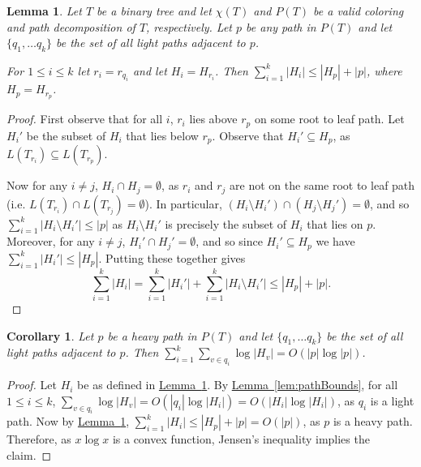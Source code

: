 \documentclass[11pt]{article}
\newtheorem{lemma}[theorem]{Lemma}
\newtheorem{corollary}[theorem]{Corollary}
\theoremstyle{definition}
\newcommand{\Lem}[1]{\hyperref[lem:#1]{Lemma~\ref*{lem:#1}}} %
\begin{document}
\begin{lemma}
\label{lem:adjacent}
 Let $T$ be a binary tree and let $\chi(T)$ and $P(T)$ be a valid coloring and path decomposition of $T$, respectively.
 Let $p$ be any path in $P(T)$ and let $\{q_1, \dots q_k\}$ be the set of all light paths adjacent to $p$.
 
 For $1\leq i\leq k$ let $r_i = r_{q_i}$ and let $H_i = H_{r_i}$.
 Then $\sum_{i=1}^k |H_i| \leq |H_p|+|p|$, where $H_p = H_{r_p}$.
\end{lemma}
\begin{proof}
 First observe that for all $i$, $r_{i}$ lies above $r_p$ on some root to leaf path. 
 Let $H_i'$ be the subset of $H_i$ that lies below $r_p$.  Observe that $H_i'\subseteq H_p$, as $L(T_{r_i})\subseteq L(T_{r_p})$.
  
 Now for any $i\neq j$, $H_i \cap H_j = \emptyset$, as $r_{i}$ and $r_{j}$ are not on the same root to leaf path (i.e. $L(T_{r_i}) \cap L(T_{r_j}) = \emptyset$).
 In particular, $(H_i\setminus H_i') \cap (H_j \setminus H_j') = \emptyset$, and so $\sum_{i=1}^k |H_i\setminus H_i'| \leq |p|$ 
 as $H_i\setminus H_i'$ is precisely the subset of $H_i$ that lies on $p$.
 Moreover, for any $i\neq j$, $ H_i' \cap H_j' = \emptyset$, and so since $H_i'\subseteq H_p$ we have $\sum_{i=1}^k |H_i'|\leq |H_p|$.
 Putting these together gives
 \[
  \sum_{i=1}^k |H_i| = \sum_{i=1}^k |H_i'| + \sum_{i=1}^k |H_i\setminus H_i'| \leq |H_p|+|p|.
 \]
\end{proof}

\begin{corollary}
 Let $p$ be a heavy path in $P(T)$ and let $\{q_1, \dots q_k\}$ be the set of all light paths adjacent to $p$.
 Then $\sum_{i=1}^k \sum_{v\in q_i} \log |H_v| = O(|p|\log |p|)$.
\end{corollary}
\begin{proof}
 Let $H_i$ be as defined in \Lem{adjacent}.  By \Lem{pathBounds}, for all $1\leq i\leq k$, 
 $\sum_{v\in q_i} \log |H_v| = O(|q_i|\log |H_i|) = O(|H_i|\log |H_i|)$, as $q_i$ is a light path.
 Now by \Lem{adjacent}, $\sum_{i=1}^k |H_i| \leq |H_p|+|p| = O(|p|)$, as $p$ is a heavy path. 
 Therefore, as $x\log x$ is a convex function, Jensen's inequality implies the claim.
 
\end{proof}
\end{document}
